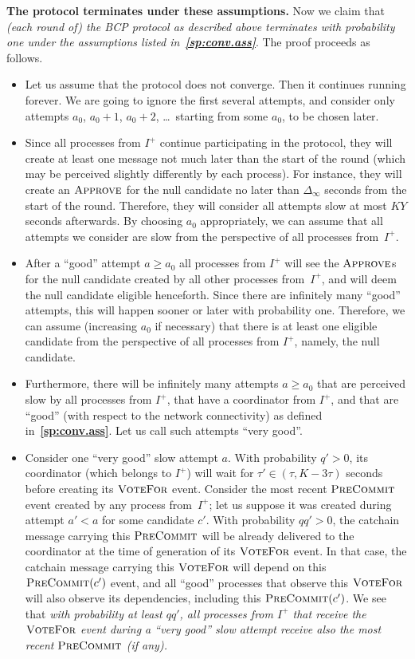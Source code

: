 \documentclass[12pt,oneside]{article}
\def\makepoint#1{\medbreak\noindent{\bf #1.\ }}
\def\nxsubpoint{\refstepcounter{subsubsection}%
  \smallbreak\makepoint{\thesubsubsection}}
\def\refpoint#1{{\rm\textbf{\ref{#1}}}}
\let\ptref=\refpoint
\def\emb#1{\textbf{#1.}}
\def\opsc#1{\operatorname{\textsc{#1}}}
\def\Approve{\opsc{Approve}}
\def\PreCommit{\opsc{PreCommit}}
\def\VoteFor{\opsc{VoteFor}}
\begin{document}
\nxsubpoint\emb{The protocol terminates under these assumptions}
Now we claim that {\em (each round of) the BCP protocol as described above terminates with probability one under the assumptions listed in~\ptref{sp:conv.ass}}. The proof proceeds as follows.
\begin{itemize}
\item Let us assume that the protocol does not converge. Then it continues running forever. We are going to ignore the first several attempts, and consider only attempts $a_0$, $a_0+1$, $a_0+2$, \dots\ starting from some $a_0$, to be chosen later.
\item Since all processes from $I^+$ continue participating in the protocol, they will create at least one message not much later than the start of the round (which may be perceived slightly differently by each process). For instance, they will create an $\Approve$ for the null candidate no later than $\Delta_\infty$ seconds from the start of the round. Therefore, they will consider all attempts slow at most $KY$ seconds afterwards. By choosing $a_0$ appropriately, we can assume that all attempts we consider are slow from the perspective of all processes from~$I^+$.
\item After a ``good'' attempt $a\geq a_0$ all processes from $I^+$ will see the $\Approve$s for the null candidate created by all other processes from~$I^+$, and will deem the null candidate eligible henceforth. Since there are infinitely many ``good'' attempts, this will happen sooner or later with probability one. Therefore, we can assume (increasing $a_0$ if necessary) that there is at least one eligible candidate from the perspective of all processes from $I^+$, namely, the null candidate.
\item Furthermore, there will be infinitely many attempts $a\geq a_0$ that are perceived slow by all processes from $I^+$, that have a coordinator from $I^+$, and that are ``good'' (with respect to the network connectivity) as defined in~\ptref{sp:conv.ass}. Let us call such attempts ``very good''.
\item Consider one ``very good'' slow attempt $a$. With probability $q'>0$, its coordinator (which belongs to $I^+$) will wait for $\tau'\in(\tau,K-3\tau)$ seconds before creating its $\VoteFor$ event. Consider the most recent $\PreCommit$ event created by any process from~$I^+$; let us suppose it was created during attempt $a'<a$ for some candidate $c'$. With probability $qq'>0$, the catchain message carrying this $\PreCommit$ will be already delivered to the coordinator at the time of generation of its $\VoteFor$ event. In that case, the catchain message carrying this $\VoteFor$ will depend on this $\PreCommit(c')$ event, and all ``good'' processes that observe this $\VoteFor$ will also observe its dependencies, including this $\PreCommit(c')$. We see that {\em with probability at least $qq'$, all processes from $I^+$ that receive the $\VoteFor$ event during a ``very good'' slow attempt receive also the most recent $\PreCommit$ (if any).}

\end{itemize}
\end{document}
